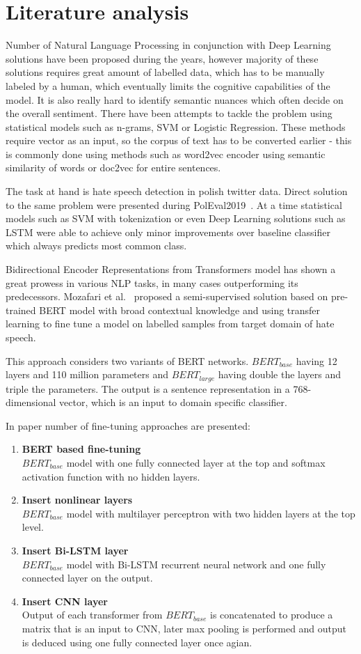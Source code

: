 \documentclass[a4paper]{article}
\begin{document}
\section{Literature analysis}
Number of Natural Language Processing in conjunction with Deep Learning solutions have been proposed during the years, however majority of these solutions requires great amount of labelled data, which has to be manually labeled by a human, which eventually limits the cognitive capabilities of the model. It is also really hard to identify semantic nuances which often decide on the overall sentiment. There have been attempts to tackle the problem using statistical models such as n-grams, SVM or Logistic Regression. These methods require vector as an input, so the corpus of text has to be converted earlier - this is commonly done using methods such as word2vec encoder using semantic similarity of words or doc2vec for entire sentences.
\par
The task at hand is hate speech detection in polish twitter data. Direct solution to the same problem were presented during PolEval2019~\cite{poleval}. At a time statistical models such as SVM with tokenization or even Deep Learning solutions such as LSTM were able to achieve only minor improvements over baseline classifier which always predicts most common class.
\par
Bidirectional Encoder Representations from Transformers model has shown a great prowess in various NLP tasks, in many cases outperforming its predecessors.
Mozafari et al.~\cite{paper} proposed a semi-supervised solution based on pre-trained BERT model with broad contextual knowledge and using transfer learning to fine tune a model on labelled samples from target domain of hate speech. 
\par
This approach considers two variants of BERT networks. $BERT_{base}$ having 12 layers and 110 million parameters and $BERT_{large}$ having double the layers and triple the parameters. The output is a sentence representation in a 768-dimensional vector, which is an input to domain specific classifier.
\par
In paper number of fine-tuning approaches are presented:
\begin{enumerate}
    \item \textbf{BERT based fine-tuning} \\
    $BERT_{base}$ model with one fully connected layer at the top and softmax activation function with no hidden layers.
    \item \textbf{Insert nonlinear layers} \\
    $BERT_{base}$ model with multilayer perceptron with two hidden layers at the top level.
    \item \textbf{Insert Bi-LSTM layer} \\
    $BERT_{base}$ model with Bi-LSTM recurrent neural network and one fully connected layer on the output.
    \item \textbf{Insert CNN layer} \\
    Output of each transformer from $BERT_{base}$ is concatenated to produce a matrix that is an input to CNN, later max pooling is performed and output is deduced using one fully connected layer once agian.
\end{enumerate}
\end{document}
